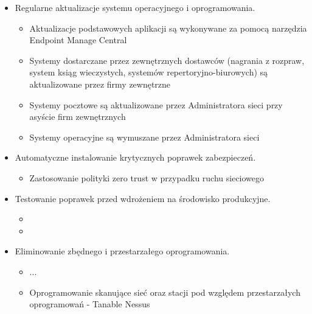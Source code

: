 \begin{itemize}
    \item Regularne aktualizacje systemu operacyjnego i oprogramowania.
    \begin{itemize}
        \item {Aktualizacje podstawowych aplikacji są wykonywane za pomocą narzędzia Endpoint Manage Central}
        \item {Systemy dostarczane przez zewnętrznych dostawców (nagrania z rozpraw, system ksiąg wieczystych, systemów repertoryjno-biurowych) są aktualizowane przez firmy zewnętrzne}
        \item {Systemy pocztowe są aktualizowane przez Administratora sieci przy asyście firm zewnętrznych}
        \item {Systemy operacyjne są wymuszane przez Administratora sieci}
    \end{itemize}
    
    \item Automatyczne instalowanie krytycznych poprawek zabezpieczeń.
    \begin{itemize}
        \item {Zastosowanie polityki zero trust w przypadku ruchu sieciowego}
    \end{itemize}
    
    \item Testowanie poprawek przed wdrożeniem na środowisko produkcyjne.
    \begin{itemize}
        \item {}
        \item {}
    \end{itemize}
    
    \item Eliminowanie zbędnego i przestarzałego oprogramowania. 
    \begin{itemize}
        \item {...}
        \item {Oprogramowanie skanujące sieć oraz stacji pod względem przestarzałych oprogramowań - Tanable Nessus}
    \end{itemize}
    
\end{itemize}